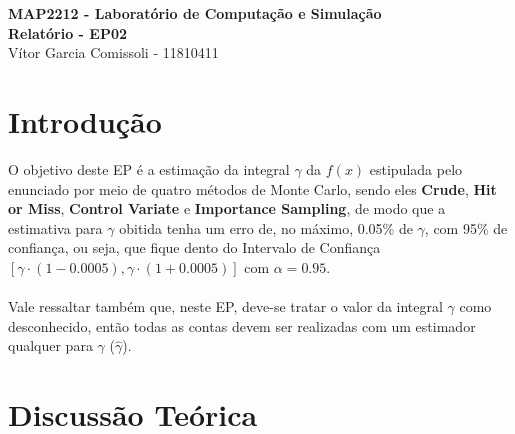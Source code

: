 \documentclass{article}
\begin{document}
\begin{center}
    \textbf{\LARGE MAP2212 - Laboratório de Computação e Simulação}\\
    \vspace{0.3cm}
    \textbf{\Large Relatório - EP02}\\
    \vspace{0.3cm}
    \large{Vítor Garcia Comissoli - 11810411}
\end{center}

\section{Introdução}
    
    O objetivo deste EP é a estimação da integral $\gamma$ da $f(x)$ estipulada pelo enunciado por meio de quatro métodos de Monte Carlo, sendo eles \textbf{Crude}, \textbf{Hit or Miss}, \textbf{Control Variate} e \textbf{Importance Sampling}, de modo que a estimativa para $\gamma$ obitida tenha um erro de, no máximo, 0.05\% de $\gamma$, com 95\% de confiança, ou seja, que fique dento do Intervalo de Confiança $[\gamma\cdot(1 - 0.0005),\gamma\cdot(1 + 0.0005)]$ com $\alpha=0.95$.\\
    \\
    Vale ressaltar também que, neste EP, deve-se tratar o valor da integral $\gamma$ como desconhecido, então todas as contas devem ser realizadas com um estimador qualquer para $\gamma$ ($\hat{\gamma}$).
    
\section{Discussão Teórica}
    
\end{document}
